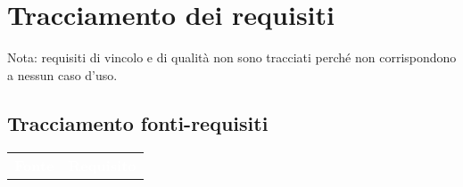 
\section{Tracciamento dei requisiti}
Nota: requisiti di vincolo e di qualità non sono tracciati perché non corrispondono a nessun caso d'uso.
\subsection{Tracciamento fonti-requisiti} 
\begin{tabularx}{\textwidth}{c|c}
	
	\rowcolor{greySWEight}
	\textcolor{white}{\textbf{Fonte}} &
	\textcolor{white}{\textbf{Requisito}}\endhead
	

\end{tabularx}
